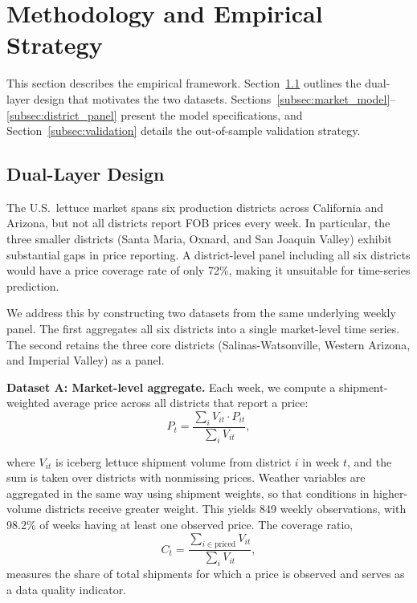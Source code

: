 \documentclass[12pt]{article}
\begin{document}
\section{Methodology and Empirical Strategy}
\label{sec:methods}

This section describes the empirical framework. Section~\ref{subsec:dual_layer} outlines the dual-layer design that motivates the two datasets. Sections~\ref{subsec:market_model}--\ref{subsec:district_panel} present the model specifications, and Section~\ref{subsec:validation} details the out-of-sample validation strategy.

\subsection{Dual-Layer Design}
\label{subsec:dual_layer}

The U.S.\ lettuce market spans six production districts across California and Arizona, but not all districts report FOB prices every week. In particular, the three smaller districts (Santa Maria, Oxnard, and San Joaquin Valley) exhibit substantial gaps in price reporting. A district-level panel including all six districts would have a price coverage rate of only 72\%, making it unsuitable for time-series prediction.

We address this by constructing two datasets from the same underlying weekly panel. The first aggregates all six districts into a single market-level time series. The second retains the three core districts (Salinas-Watsonville, Western Arizona, and Imperial Valley) as a panel.

\textbf{Dataset A: Market-level aggregate.} Each week, we compute a shipment-weighted average price across all districts that report a price:
\begin{equation}
\label{eq:weighted_price}
P_t = \frac{\sum_{i} V_{it} \cdot P_{it}}{\sum_{i} V_{it}},
\end{equation}

where $V_{it}$ is iceberg lettuce shipment volume from district $i$ in week $t$, and the sum is taken over districts with nonmissing prices. Weather variables are aggregated in the same way using shipment weights, so that conditions in higher-volume districts receive greater weight. This yields 849 weekly observations, with 98.2\% of weeks having at least one observed price. The coverage ratio,
\begin{equation}
\label{eq:coverage}
C_t = \frac{\sum_{i \in \text{priced}} V_{it}}{\sum_{i} V_{it}},
\end{equation}
measures the share of total shipments for which a price is observed and serves as a data quality indicator.
\end{document}
